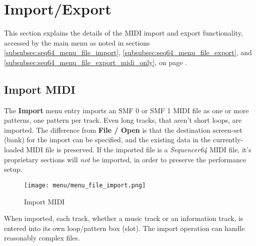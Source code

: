 %
%
%

\section{Import/Export}
\label{sec:seq64_midi_export}

   This section explains the details of the MIDI import and export
   functionality, accessed by the main menu as noted in
   sections
   \ref{subsubsec:seq64_menu_file_import},
   \ref{subsubsec:seq64_menu_file_export}, and
   \ref{subsubsec:seq64_menu_file_export_midi_only}, on page
   \pageref{subsubsec:seq64_menu_file_import}.


\subsection{Import MIDI}
\label{subsec:seq64_midi_export_file_import}

   The \textbf{Import} menu entry imports an SMF 0
   or SMF 1 MIDI file as one or more patterns, one pattern per track.
   Even long tracks, that aren't short loops, are imported.
   The difference from \textbf{File / Open} is that the destination screen-set
   (bank) for the import can be specified, and the existing data in the
   currently-loaded MIDI file is preserved.
   If the imported file is a
   \textsl{Sequencer64} MIDI file, it's proprietary sections will
   \textsl{not} be imported, in order to preserve the performance setup.

\begin{figure}[H]
   \centering 
   \texttt{[image: menu/menu\_file\_import.png]}
   \caption{Import MIDI}
   \label{fig:seq64_midi_export_file_import}
\end{figure}

   When imported, each track, whether a music track or an information track,
   is entered into its own loop/pattern box (slot).  The import operation can
   handle reasonably complex files.

